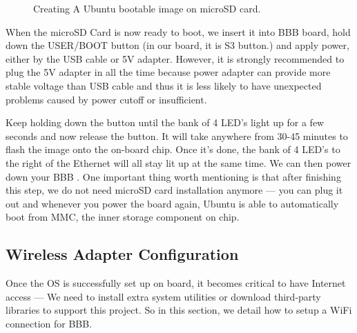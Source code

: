 \documentclass[12pt,journal,draftclsnofoot,onecolumn]{IEEEtran}
\begin{document}
\begin{figure}[htb]
	\centering
     \caption{Creating A Ubuntu bootable image on microSD card.}
     \end{figure}

When the microSD Card is now ready to boot, we insert it into BBB board, hold down the USER/BOOT button (in our board, it is S3 button.) and apply power, either by the USB cable or 5V adapter. However, it is strongly recommended to plug the 5V adapter in all the time because power adapter can provide more stable voltage than USB cable and thus it is less likely to have unexpected problems caused by power cutoff or insufficient.

Keep holding down the button until  the bank of 4 LED's light up for a few seconds and now release the button.
It will take anywhere from 30-45 minutes to flash the image onto the on-board chip. Once it's done, the bank of 4 LED's to the right of the Ethernet will all stay lit up at the same time. We can then power down your BBB \cite{flashBB}. One important thing worth mentioning is that after finishing this step, we do not need microSD card installation anymore --- you can plug it out and whenever you power the board again, Ubuntu is able to automatically boot from MMC, the inner storage component on chip.
	
\subsection{Wireless Adapter Configuration}\label{Wireless}
Once the OS is successfully set up on board, it becomes critical to have Internet access --- We need to install extra system utilities or download third-party libraries to support this project. So in this section, we detail how to setup a WiFi connection for BBB.
\end{document}
